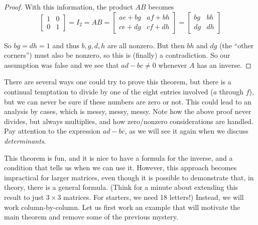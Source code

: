\documentclass{ximera}
\begin{document}
\begin{theorem}
\begin{proof}
  With this information, the product $AB$ becomes
  \[
    \begin{bmatrix}
      1 & 0\\
      0 & 1
    \end{bmatrix}
    =I_2
    =AB
    =
    \begin{bmatrix}
      ae+bg & af+bh\\
      ce+dg & cf+dh
    \end{bmatrix}
    =
    \begin{bmatrix}
      bg & bh\\
      dg & dh
    \end{bmatrix}
  \]
  
  So $bg=dh=1$ and thus $b,g,d,h$ are all nonzero.  But then $bh$ and
  $dg$ (the ``other corners'') must also be nonzero, so this is
  (finally) a contradiction.  So our assumption was false and we see
  that $ad-bc\neq 0$ whenever $A$ has an inverse.
\end{proof}
\end{theorem}

There are several ways one could try to prove this theorem, but there
is a continual temptation to divide by one of the eight entries
involved ($a$ through $f$), but we can never be sure if these numbers
are zero or not.  This could lead to an analysis by cases, which is
messy, messy, messy.  Note how the above proof never divides, but
always multiplies, and how zero/nonzero considerations are handled.
Pay attention to the expression $ad-bc$, as we will see it again when
we discuss \textit{determinants}.

This theorem is fun, and it is nice to have a formula for the inverse,
and a condition that tells us when we can use it.  However, this
approach becomes impractical for larger matrices, even though it is
possible to demonstrate that, in theory, there is a general formula.
(Think for a minute about extending this result to just $3\times 3$
matrices.  For starters, we need 18 letters!)  Instead, we will work
column-by-column.  Let us first work an example that will motivate the
main theorem and remove some of the previous mystery.
\end{document}
